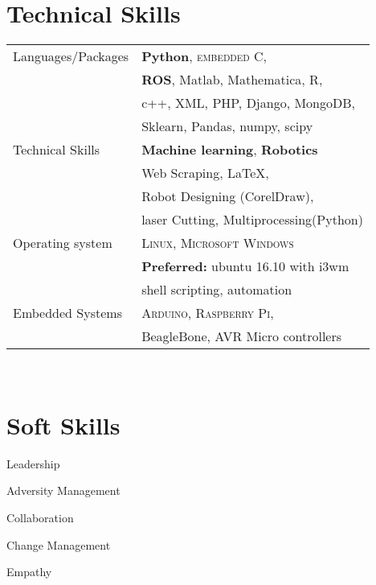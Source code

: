 \documentclass[11pt,a4paper,sans]{moderncv}        %
\begin{document}
\section{Technical Skills}
\begin{tabular}{ll}

Languages/Packages\hspace{1cm}
& \textbf{Python}, \textsc{embedded C},\\
& \textbf{ROS}, Matlab, Mathematica, R, \\
& c++, XML, PHP, Django, MongoDB, \\
& Sklearn, Pandas, numpy, scipy \\
 

Technical Skills\hspace{1cm}
& \textbf{Machine learning}, \textbf{Robotics} \\
& Web Scraping, \LaTeX, \\
& Robot Designing (CorelDraw), \\
& laser Cutting, Multiprocessing(Python) \\

Operating system\hspace{1cm}
& \textsc{Linux}, \textsc{Microsoft Windows} \\
& \textbf{Preferred:} ubuntu 16.10 with i3wm \\
& shell scripting, automation \\

Embedded Systems\hspace{1cm}
& \textsc{Arduino}, \textsc{Raspberry Pi}, \\
& BeagleBone, AVR Micro controllers\\
\end{tabular}\\[8pt]

\section{Soft Skills}
\begin{enumerate}
{\setlength\itemindent{120pt} \item Leadership}
{\setlength\itemindent{120pt} \item Adversity Management}
{\setlength\itemindent{120pt} \item Collaboration}
{\setlength\itemindent{120pt} \item Change Management}
{\setlength\itemindent{120pt} \item Empathy}
\end{enumerate}
\end{document}
